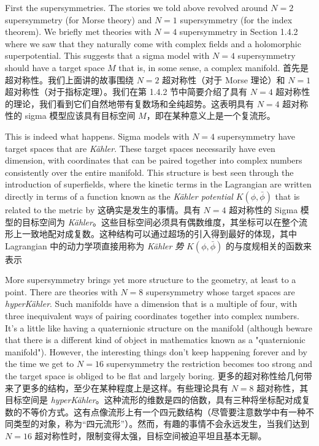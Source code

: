 \documentclass{ctexart}
\begin{document}
\begin{paracol}{2}
First the supersymmetries. The stories we told above revolved around $N = 2$ supersymmetry (for Morse theory) and $N = 1$ supersymmetry (for the index theorem). We briefly met theories with $N = 4$ supersymmetry in Section 1.4.2 where we saw that they naturally come with complex fields and a holomorphic superpotential. This suggests that a sigma model with $N = 4$ supersymmetry should have a target space $M$ that is, in some sense, a complex manifold.
\switchcolumn
首先是超对称性。我们上面讲的故事围绕 $N = 2$ 超对称性（对于 Morse 理论）和 $N = 1$ 超对称性（对于指标定理）。我们在第 1.4.2 节中简要介绍了具有 $N = 4$ 超对称性的理论，我们看到它们自然地带有复数场和全纯超势。这表明具有 $N = 4$ 超对称性的 sigma 模型应该具有目标空间 $M$，即在某种意义上是一个复流形。
\switchcolumn*

This is indeed what happens. Sigma models with $N = 4$ supersymmetry have target spaces that are \textit{Kähler}. These target spaces necessarily have even dimension, with coordinates that can be paired together into complex numbers consistently over the entire manifold. This structure is best seen through the introduction of superfields, where the kinetic terms in the Lagrangian are written directly in terms of a function known as the \textit{Kähler potential} $K(\phi, \bar{\phi})$ that is related to the metric by
\switchcolumn
这确实是发生的事情。具有 $N = 4$ 超对称性的 Sigma 模型的目标空间为 \textit{Kähler}。这些目标空间必须具有偶数维度，其坐标可以在整个流形上一致地配对成复数。这种结构可以通过超场的引入得到最好的体现，其中 Lagrangian 中的动力学项直接用称为 \textit{Kähler 势} $K(\phi, \bar{\phi})$ 的与度规相关的函数来表示
\switchcolumn*

More supersymmetry brings yet more structure to the geometry, at least to a point. There are theories with $N = 8$ supersymmetry whose target spaces are \textit{hyperKähler}. Such manifolds have a dimension that is a multiple of four, with three inequivalent ways of pairing coordinates together into complex numbers. It’s a little like having a quaternionic structure on the manifold (although beware that there is a different kind of object in mathematics known as a "quaternionic manifold"). However, the interesting things don’t keep happening forever and by the time we get to $N = 16$ supersymmetry the restriction becomes too strong and the target space is obliged to be ﬂat and largely boring.
\switchcolumn
更多的超对称性给几何带来了更多的结构，至少在某种程度上是这样。有些理论具有 $N = 8$ 超对称性，其目标空间是 \textit{hyperKähler}。这种流形的维数是四的倍数，具有三种将坐标配对成复数的不等价方式。这有点像流形上有一个四元数结构（尽管要注意数学中有一种不同类型的对象，称为“四元流形”）。然而，有趣的事情不会永远发生，当我们达到 $N = 16$ 超对称性时，限制变得太强，目标空间被迫平坦且基本无聊。
\switchcolumn*


\end{paracol}
\end{document}
